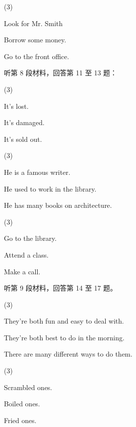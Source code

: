\documentclass{英语试卷}
\begin{document}
\begin{choices}(3)
  \item Look for Mr. Smith
  \item Borrow some money.
  \item Go to the front office.
\end{choices}
\par 听第 8 段材料，回答第 11 至 13 题：\par
{}
\begin{choices}(3)
  \item It's lost.
  \item It's damaged.
  \item It's sold out.
\end{choices}
\begin{choices}(3)
  \item He is a famous writer.
  \item He used to work in the library.
  \item He has many books on architecture.
\end{choices}
\begin{choices}(3)
  \item Go to the library.
  \item Attend a class.
  \item Make a call.
\end{choices}
\par 听第 9 段材料，回答第 14 至 17 题。\par
{}
\begin{choices}(3)
  \item They're both fun and easy to deal with.
  \item They're both best to do in the morning.
  \item There are many different ways to do them.
\end{choices}
\begin{choices}(3)
  \item Scrambled ones.
  \item Boiled ones.
  \item Fried ones.
\end{choices}
\end{document}
